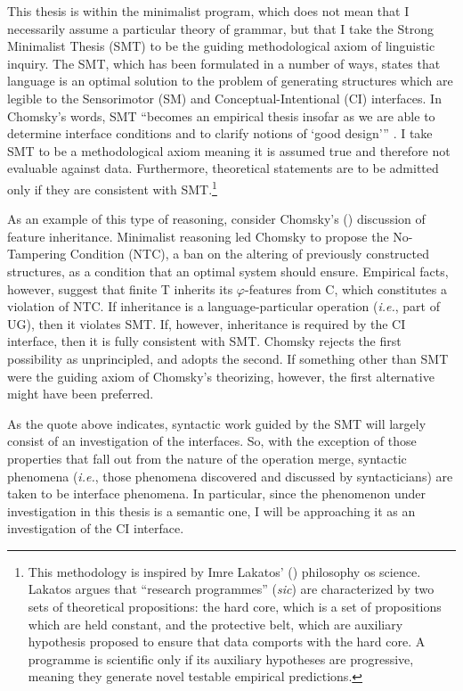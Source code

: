 \documentclass[MilwayThesis]{subfiles}
\begin{document}
This thesis is within the minimalist program, which does not mean that I necessarily assume a particular theory of grammar, but that I take the Strong Minimalist Thesis (SMT) to be the guiding methodological axiom of linguistic inquiry.
The SMT, which has been formulated in a number of ways, states that language is an optimal solution to the problem of generating structures which are legible to the Sensorimotor (SM) and Conceptual-Intentional (CI) interfaces.
In Chomsky's words, SMT ``becomes an empirical thesis insofar as we are able to determine interface conditions and to clarify notions of {`good design'}'' \parencite[1]{chomsky2001derivation}.
I take SMT to be a methodological axiom meaning it is assumed true and therefore not evaluable against data.
Furthermore, theoretical statements are to be admitted only if they are consistent with SMT.\footnote{
  This methodology is inspired by Imre Lakatos' (\citeyear{lakatos1978methodology}) philosophy os science.
  Lakatos argues that ``research programmes'' (\textit{sic}) are characterized by two sets of theoretical propositions: 
  the hard core, which is a set of propositions which are held constant, and the protective belt, which are auxiliary hypothesis proposed to ensure that data comports with the hard core.
  A programme is scientific only if its auxiliary hypotheses are progressive, meaning they generate novel testable empirical predictions.
}

As an example of this type of reasoning, consider Chomsky's (\citeyear[144]{chomsky2008on}) discussion of feature inheritance.
Minimalist reasoning led Chomsky to propose the No-Tampering Condition (NTC), a ban on the altering of previously constructed structures, as a condition that an optimal system should ensure.
Empirical facts, however, suggest that finite T inherits its $\varphi$-features from C, which constitutes a violation of NTC.
If inheritance is a language-particular operation (\textit{i.e.}, part of UG), then it violates SMT.
If, however, inheritance is required by the CI interface, then it is fully consistent with SMT.
Chomsky rejects the first possibility as unprincipled, and adopts the second.
If something other than SMT were the guiding axiom of Chomsky's theorizing, however, the first alternative might have been preferred.

As the quote above indicates, syntactic work guided by the SMT will largely consist of an investigation of the interfaces.
So, with the exception of those properties that fall out from the nature of the operation merge, syntactic phenomena (\textit{i.e.}, those phenomena discovered and discussed by syntacticians) are taken to be interface phenomena.
In particular, since the phenomenon under investigation in this thesis is a semantic one, I will be approaching it as an investigation of the CI interface.
\end{document}
